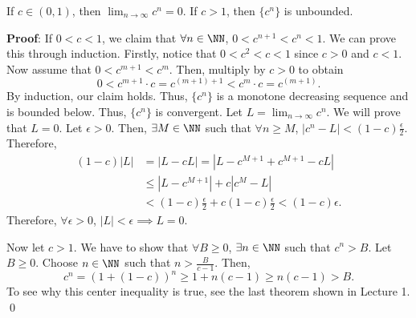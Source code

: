 \begin{theorem}
 If $c\in (0,1)$, then $\lim_{n\to \infty} c^n = 0$. If $c>1$, then $\{c^n\}$ is unbounded.
 \end{theorem}
 \textbf{Proof}: If $0<c<1$, we claim that $\forall n\in\NN$, $0 < c^{n+1} <c^n < 1$. We can prove this through induction. Firstly, notice that $0 < c^2 <c <1$ since $c>0$ and $c<1$. Now assume that $0<c^{m+1} <c^{m}$. Then, multiply by $c>0$ to obtain 
 \[
 0 < c^{m+1}\cdot c = c^{(m+1)+1}<c^{m}\cdot c = c^{(m+1)}.
 \]
 By induction, our claim holds. Thus, $\{c^n\}$ is a monotone decreasing sequence and is bounded below. Thus, $\{c^n\}$ is convergent. Let $L = \lim_{n\to\infty} c^n$. We will prove that $L= 0$. Let $\epsilon>0$. Then, $\exists M \in\NN$ such that $\forall n\geq M$, $|c^n - L| < (1-c)\frac{\epsilon}{2}$. Therefore,
 \begin{align*}
     (1-c) |L| &= |L-cL| = |L -c^{M+1} + c^{M+1} -cL| \\
     &\leq |L-c^{M+1}| + c|c^{M} - L| \\
     &< (1-c) \frac{\epsilon}{2} + c(1-c) \frac{\epsilon}{2} <(1-c) \epsilon.
 \end{align*}
 Therefore, $\forall \epsilon>0$, $|L| < \epsilon\implies L =0.$ 
 
Now let $c>1$. We have to show that $\forall B\geq 0$, $\exists n\in\NN$ such that $c^n > B$.
Let $B\geq 0$. Choose $n\in\NN$ such that $n>\frac{B}{c-1}$. Then, 
\[
c^n = (1+(1-c))^n \geq 1+n(c-1) \geq n(c-1) > B.
\]
To see why this center inequality is true, see the last theorem shown in Lecture 1. \qed 



